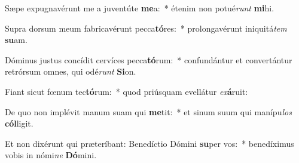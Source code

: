 \item Sæpe expugnavérunt me a juventúte \textbf{me}a:~* étenim non potué\textit{runt} \textbf{mi}hi.
\item Supra dorsum meum fabricavérunt pecca\textbf{tó}res:~* prolongavérunt iniquitá\textit{tem} \textbf{su}am.
\item Dóminus justus concídit cervíces pecca\textbf{tó}rum:~* confundántur et convertántur retrórsum omnes, qui odé\textit{runt} \textbf{Si}on.
\item Fiant sicut fœnum tec\textbf{tó}rum:~* quod priúsquam evellátur \textit{ex}\textbf{á}ruit:
\item De quo non implévit manum suam qui \textbf{me}tit:~* et sinum suum qui manípu\textit{los} \textbf{cól}ligit.
\item Et non dixérunt qui præteríbant: Benedíctio Dómini \textbf{su}per vos:~* benedíximus vobis in nómi\textit{ne} \textbf{Dó}mini.
